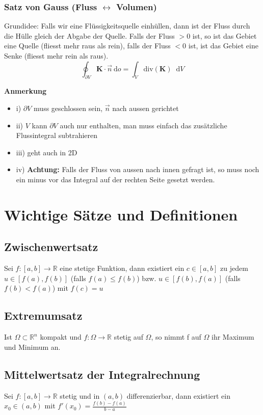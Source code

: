 \documentclass[8pt, a4paper, landscape, fleqn]{scrartcl}
\newenvironment {annotation}[1]
				{\begin{itshape} \begin{small} \textbf{#1} \begin{itemize}}
				{\end{itemize} \end{small} \end{itshape}}
\def\d{\text{d}}
\providecommand{\diff}{\mathop{} \! \mathrm{d}}
\begin{document}
\begin{multicols*}{3}
				\subsubsection{Satz von Gauss (Fluss $\leftrightarrow$ Volumen)}
				    Grundidee: Falls wir eine Flüssigkeitsquelle einhüllen, dann ist der Fluss durch die Hülle gleich der Abgabe der Quelle. Falls der Fluss $>0$ ist, so ist das Gebiet eine Quelle (fliesst mehr raus als rein), falls der Fluss $<0$ ist, ist das Gebiet eine Senke (fliesst mehr rein als raus).
					\begin{equation*}
						\oint_{\partial V}\textbf{K} \cdot \vec{n}\ \d o =\int_V \text{div}(\textbf{K})\diff V
					\end{equation*}
					\begin{annotation}{Anmerkung}
					    \item[i)] $\partial V$ muss geschlossen sein, $\vec{n}$ nach aussen gerichtet 
						\item[ii)] $V$ kann $\partial V$ auch nur enthalten, man muss einfach das zusätzliche Flussintegral subtrahieren 
						\item[iii)] geht auch in 2D
						\item[iv)] \textbf{Achtung: }Falls der Fluss von aussen nach innen gefragt ist, so muss noch ein minus vor das Integral auf der rechten Seite gesetzt werden.
					\end{annotation}

		\section{Wichtige Sätze und Definitionen}
			\subsection{Zwischenwertsatz}
			\label{sec:zwischenwertsatz}
				Sei $f: [a, b] \rightarrow \mathbb{R}$ eine stetige Funktion, dann existiert ein $c \in [a, b]$ zu jedem $u \in [f(a), f(b)]$ (falls $f(a) \le f(b)$) bzw. $u \in [f(b), f(a)]$ (falls $f(b) < f(a)$) mit $f(c)=u$
			\subsection{Extremumsatz}
			    Ist $\Omega \subset \mathbb{R}^n$ kompakt und $f: \Omega \rightarrow \mathbb{R}$ stetig auf $\Omega$, so nimmt f auf $\Omega$ ihr Maximum und Minimum an.
			\subsection{Mittelwertsatz der Integralrechnung}
				Sei $f: [a, b] \rightarrow \mathbb{R}$ stetig und in $(a, b)$ differenzierbar, dann existiert ein $x_0 \in (a, b)$ mit $f'(x_0)=\frac{f(b)-f(a)}{b-a}$

\end{multicols*}
\end{document}

